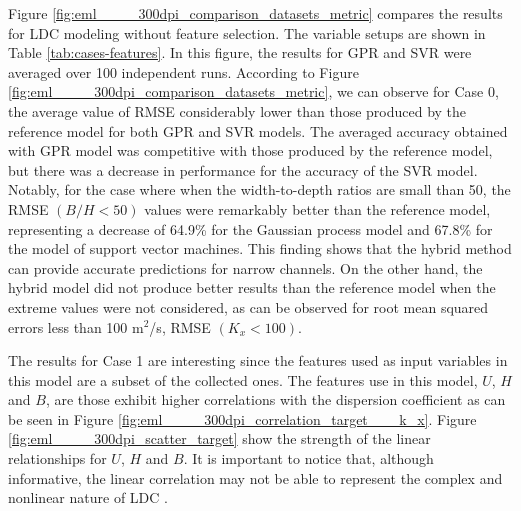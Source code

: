 \documentclass[a4paper,12pt, english]{article}
\begin{document}
Figure \ref{fig:eml____300dpi_comparison_datasets_metric}
compares the results for LDC modeling without feature selection.
The variable setups are shown in Table \ref{tab:cases-features}.
In this figure, the results for GPR and SVR were averaged over 100 independent runs.
%  
According to Figure \ref{fig:eml____300dpi_comparison_datasets_metric}, we can observe for Case 0, the average value of RMSE considerably lower than those produced by the reference model for both GPR and SVR models. The averaged accuracy obtained with GPR model was competitive with those produced by the reference model, but there was a decrease in performance for the accuracy of the SVR model. Notably, for
the case where when the width-to-depth ratios are small than 50, the RMSE $(B/H<50)$ values were remarkably better than the reference model, representing a decrease of 64.9\% for the Gaussian process model and 67.8\% for the model of support vector machines. This finding shows that the hybrid method can provide accurate predictions for narrow channels. 
On the other hand, the hybrid model did not produce better results than the reference model when the extreme values were not considered, as can be observed for root mean squared errors less than 100 m$^2$/s, RMSE $ (K_x <100)$. 

The results for Case 1 are interesting since the features used as input variables in this model are a subset of the collected ones.  The features use in this model, $U$, $H$ and $B$, are those exhibit  higher correlations with the dispersion coefficient as can be seen in Figure \ref{fig:eml____300dpi_correlation_target___k_x}. Figure \ref{fig:eml____300dpi_scatter_target} show the strength of the linear relationships for $U$, $H$ and $B$.
It is important to notice that, although informative, the linear correlation may not be able to represent the complex and nonlinear nature of LDC \cite{noori2016reliable}. 
\end{document}
